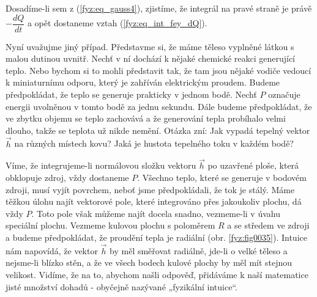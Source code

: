         Dosadíme-li sem z (\ref{fyz:eq_gauss4}), zjistíme, že integrál na pravé straně je právě
        \(-\dfrac{dQ}{dt}\) a opět dostaneme vztah (\ref{fyz:eq_int_fey_dQ}).
        
        Nyní uvažujme jiný případ. Představme si, že máme těleso vyplněné látkou s malou dutinou
        uvnitř. Nechť v ní dochází k nějaké chemické reakci generující teplo. Nebo bychom si to
        mohli představit tak, že tam jsou nějaké vodiče vedoucí k miniaturnímu odporu, který je
        zahříván elektrickým proudem. Budeme předpokládat, že teplo se generuje prakticky v jednom
        bodě. Nechť \(P\) označuje energii uvolněnou v tomto bodě za jednu sekundu. Dále budeme
        předpokládat, že ve zbytku objemu se teplo zachovává a že generování tepla probíhalo velmi
        dlouho, takže se teplota už nikde nemění. Otázka zní: Jak vypadá tepelný vektor \(\vec{h}\)
        na různých místech kovu? Jaká je hustota tepelného toku v každém bodě?
        
        Víme, že integrujeme-li normálovou složku vektoru \(\vec{h}\) po uzavřené ploše, která
        obklopuje zdroj, vždy dostaneme \(P\). Všechno teplo, které se generuje v bodovém zdroji,
        musí vyjít povrchem, neboť jsme předpokládali, že tok je stálý. Máme těžkou úlohu najít
        vektorové pole, které integrováno přes jakoukoliv plochu, dá vždy \(P\). Toto pole však
        můžeme najít docela snadno, vezmeme-li v úvahu speciální plochu. Vezmeme kulovou plochu s
        poloměrem \(R\) a se středem ve zdroji a budeme předpokládat, že proudění tepla je radiální
        (obr. \ref{fyz:fig0035}). Intuice nám napovídá, že vektor \(\vec{h}\) by měl směřovat
        radiálně, jde-li o velké těleso a nejsme-li blízko stěn, a že ve všech bodech kulové plochy
        by měl mít stejnou velikost. Vidíme, že na to, abychom našli odpověď, přidáváme k naší
        matematice jisté množství dohadů - obyčejně nazývané „fyzikální intuice“.
  
